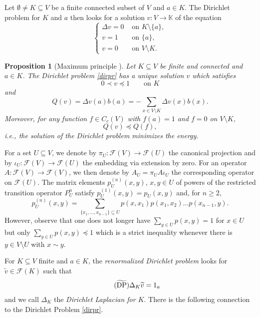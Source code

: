 \documentclass[a4paper,oneside, 12pt]{amsart}
\numberwithin{theorem}{section}
\newtheorem{proposition}[theorem]{Proposition}
\theoremstyle{definition}
\newcommand{\subsV}{U}
\begin{document}
{Let $ \emptyset\neq K\subseteq V $ be  a finite  connected subset of $V$ and $ a\in K $. The Dirichlet problem for $ K $ and $ a $ then looks for a solution $ v: V\to \mathbb{K} $ of the equation
\begin{equation}\label{dirpr} \tag{DP}
\begin{cases}
\Delta v=0 &\mbox{ on  }K\setminus\{a\},\\
v=1&\mbox{ on  }\{a\},\\
v= 0 &\mbox{ on  }V\setminus K.
\end{cases}
\end{equation}

\begin{proposition}[Maximum principle \cite{Muranova1}]\label{thm::maxpr} Let $ K\subseteq V $ be finite and connected and $ a\in K $. 
	 The Dirichlet problem \eqref{dirpr} has a unique solution $ v $ which   satisfies
	 $$  0 \prec v \preceq 1\qquad \mbox{on } K$$
	 and
	 \begin{equation*}
	Q(v)=\Delta v(a)b(a)=-\sum_{x\in V\setminus K}\Delta v(x)b(x).
	 \end{equation*}
	 Moreover, for any function $f\in C_c(V)$ with $f(a)=1$  and $f=0$ on $ V\setminus K $,
	 \begin{equation*}
	 Q(v)\preceq Q(f),
	 \end{equation*}
	 i.e., the solution of the Dirichlet problem minimizes the energy.
\end{proposition}


For a set $ U \subseteq V $, we denote by $ \pi_{U}: \mathcal{F}(V)\to \mathcal{F}(U) $ the canonical projection and by $ \iota_U: \mathcal{F}(V)\to \mathcal{F}(U)  $ the embedding via extension by zero. For an operator $ A: \mathcal{F}(V)\to \mathcal{F}(V)  $, we then denote by $ A_{U} =  \pi_U A\iota_{U} $ the corresponding operator on $ \mathcal{F}(U) $. 
The matrix elements $ p^{(n)}_\subsV(x,y) $, $x,y\in \subsV$ of  powers of the restricted transition operator $ P_{U}^{n} $ satisfy $ p^{(1)}_{\subsV} (x,y)=p_{U}(x,y) $ and, for $ n\ge 2 $,
$$ p^{(n)}_\subsV(x,y) = \sum_{\{x_1,\ldots,x_{n-1}\}\subseteq\subsV}p(x, x_1)p(x_1,x_2)\dots p(x_{n-1},y).$$
However, observe that one does not longer have $ \sum_{y\in U}p({x,y})=1 $ for $ x\in U $ but only $ \sum_{y\in U}p({x,y})\preceq 1 $ which is a strict inequality whenever there is $ y\in V\setminus U $ with $ x\sim y $.


For   $K\subseteq V$ finite and  $a\in K$, the {\em renormalized Dirichlet problem} looks for $ \widetilde{v}\in \mathcal{F}(K) $ such that
\begin{equation}\label{dirprmod} \tag{$ \widetilde{\mathrm{DP}}$}
\Delta_K\widetilde v= 1_a
\end{equation}
and we call $ \Delta_{K} $ the \emph{Dirichlet Laplacian for $ K $}.
There is the following connection to the Dirichlet Problem \eqref{dirpr}.

}
\end{document}

